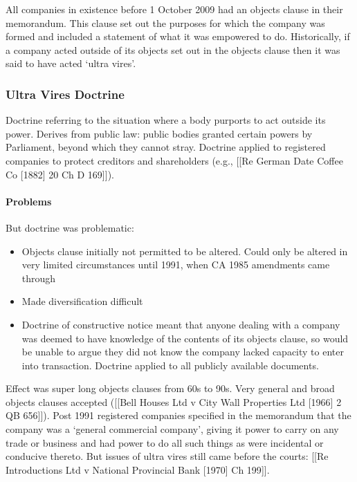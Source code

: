 \documentclass[
]{article}
\providecommand{\tightlist}{%
  \setlength{\itemsep}{0pt}\setlength{\parskip}{0pt}}
\begin{document}
All companies in existence before 1 October 2009 had an objects clause
in their memorandum. This clause set out the purposes for which the
company was formed and included a statement of what it was empowered to
do. Historically, if a company acted outside of its objects set out in
the objects clause then it was said to have acted `ultra vires'.

\hypertarget{ultra-vires-doctrine}{%
\subsubsection{Ultra Vires Doctrine}\label{ultra-vires-doctrine}}

Doctrine referring to the situation where a body purports to act outside
its power. Derives from public law: public bodies granted certain powers
by Parliament, beyond which they cannot stray. Doctrine applied to
registered companies to protect creditors and shareholders (e.g.,
{[}{[}Re German Date Coffee Co {[}1882{]} 20 Ch D 169{]}{]}).

\hypertarget{problems}{%
\paragraph{Problems}\label{problems}}

But doctrine was problematic:

\begin{itemize}
\tightlist
\item
  Objects clause initially not permitted to be altered. Could only be
  altered in very limited circumstances until 1991, when CA 1985
  amendments came through
\item
  Made diversification difficult
\item
  Doctrine of constructive notice meant that anyone dealing with a
  company was deemed to have knowledge of the contents of its objects
  clause, so would be unable to argue they did not know the company
  lacked capacity to enter into transaction. Doctrine applied to all
  publicly available documents.
\end{itemize}

Effect was super long objects clauses from 60s to 90s. Very general and
broad objects clauses accepted ({[}{[}Bell Houses Ltd v City Wall
Properties Ltd {[}1966{]} 2 QB 656{]}{]}). Post 1991 registered
companies specified in the memorandum that the company was a `general
commercial company', giving it power to carry on any trade or business
and had power to do all such things as were incidental or conducive
thereto. But issues of ultra vires still came before the courts:
{[}{[}Re Introductions Ltd v National Provincial Bank {[}1970{]} Ch
199{]}{]}.
\end{document}
